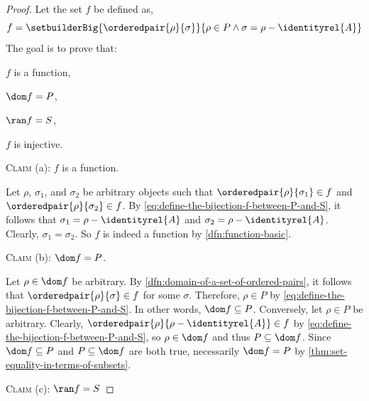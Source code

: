 \begin{proof}
    Let the set \( f \) be defined as,
    \begin{equation}
        \label{eq:define-the-bijection-f-between-P-and-S}
        f = \setbuilderBig{\orderedpair{\rho}{\sigma}}{ \rho \in P \land \sigma = \rho - \identityrel{A} }
    \end{equation}
    The goal is to prove that:
    \begin{enumerate*}[label=(\alph*)]
        \item \( f \) is a function,
        \item \( \dom f = P \),
        \item \( \ran f = S \),
        \item \( f \) is injective.
    \end{enumerate*}

    \vspace{0.5cm}
    \noindent
    {\scshape Claim} (a): \( f \) is a function.

    \vspace{0.2cm}
    \noindent
    Let \( \rho \), \( \sigma_{1} \), and \( \sigma_{2} \) be arbitrary objects such that \( \orderedpair{\rho}{\sigma_{1}} \in f \)
    and \( \orderedpair{\rho}{\sigma_{2}} \in f \). By \eqref{eq:define-the-bijection-f-between-P-and-S}, it follows that \( \sigma_{1} = \rho - \identityrel{A} \)
    and \( \sigma_{2} = \rho - \identityrel{A} \). Clearly, \( \sigma_{1} = \sigma_{2} \). So \( f \) is indeed a function by \cref{dfn:function-basic}.

    \vspace{0.5cm}
    \noindent
    {\scshape Claim} (b): \( \dom f = P \).

    \vspace{0.2cm}
    \noindent
    Let \( \rho \in \dom f \) be arbitrary. By \cref{dfn:domain-of-a-set-of-ordered-pairs}, it follows that \( \orderedpair{\rho}{\sigma} \in f \)
    for some \( \sigma \). Therefore, \( \rho \in P \) by \eqref{eq:define-the-bijection-f-between-P-and-S}. In other words, \( \dom f \subseteq P \).
    Conversely, let \( \rho \in P \) be arbitrary. Clearly, \( \orderedpair{\rho}{\rho - \identityrel{A}} \in f \) by \eqref{eq:define-the-bijection-f-between-P-and-S},
    so \( \rho \in \dom f \) and thus \( P \subseteq \dom f \). Since \( \dom f \subseteq P \) and \( P \subseteq \dom f \) are both true, necessarily \( \dom f = P \)
    by \cref{thm:set-equality-in-terms-of-subsets}.

    \vspace{0.5cm}
    \noindent
    {\scshape Claim} (c): \( \ran f = S \)


\end{proof}
